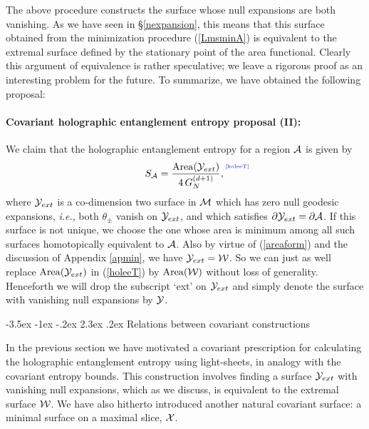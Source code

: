 \documentclass[12pt]{article}
\makeatletter
\renewcommand\section{\@startsection {section}{1}{\z@}%
                                   {-3.5ex \@plus -1ex \@minus -.2ex}%
                                   {2.3ex \@plus.2ex}%
                                   {\normalfont\large\bfseries}}
\def\sec#1{\S \;\ref{#1}}
\def\req#1{(\ref{#1})}
\def\App#1{Appendix \ref{#1}}
\def\ie{{\it i.e.}}
\def\p{\partial}
\def\CA{{\cal A}}
\def\CW{{\cal W}}
\def\CX{{\cal X}}
\def\CY{{\cal Y}}
\def\p{\partial}
\def\p{\partial}
\def\Label#1{\label{#1}%
{ \color{blue}{\smash{\hbox to0pt{\raise2ex\hbox{\tiny[#1]}\hss}}}}}
\def\bulk{{\cal M}}
\def\Gms{\CW}
\def\Lms{\CY}
\def\Xms{\CX}
\def\rA{\CA}
\def\brA{\p \CA}
\def\area#1{{\rm Area}(#1)}
\makeatother
\begin{document}
The above procedure constructs the surface whose null expansions are
both vanishing. As we have seen in \sec{nexpansion}, this means that
this surface obtained from the minimization procedure
(\ref{LmsminA}) is equivalent to the extremal surface defined by the
stationary point of the area functional. Clearly this argument of
equivalence is rather speculative; we leave a rigorous proof as an
interesting problem for the future.  To summarize, we have obtained the
following proposal:
 \paragraph{Covariant holographic entanglement entropy proposal (II):}

We claim that the holographic entanglement entropy for a region
$\rA$ is given by
%
\begin{equation}
S_\rA = {\area{\Lms_{ext}}  \over 4 \, G_N^{(d+1)} }, \Label{holeeT}
\end{equation}
%
where $\Lms_{ext}$ is a co-dimension two surface in $\bulk$ which
has zero null geodesic expansions,  \ie, both $\theta_\pm$ vanish on
$\Lms_{ext}$, and which satisfies  $\p\Lms_{ext} =\brA$. If this
surface is not unique, we choose the one whose area is minimum
 among all such surfaces homotopically equivalent to $\rA$.
 Also by virtue of \req{areaform} and the discussion of \App{apmin},
 we have $\Lms_{ext} = \Gms$. So we can just as well replace $\area{\Lms_{ext}}$ in \req{holeeT}
 by $\area{\Gms}$ without loss of generality.
 Henceforth we will drop the subscript `ext' on $\Lms_{ext}$ and
  simply denote the surface with vanishing null expansions by $\Lms$.


\section{Relations between covariant constructions}
\label{covother}

In the previous section we have motivated a covariant prescription
for calculating the holographic entanglement entropy using
light-sheets, in analogy with the covariant entropy bounds. This
construction involves finding a surface $\Lms_{ext}$ with vanishing null
expansions, which as we discuss, is equivalent to the extremal surface
$\Gms$.  We have also hitherto introduced another natural covariant surface: a
minimal surface on a maximal slice, $\Xms$.
\end{document}
